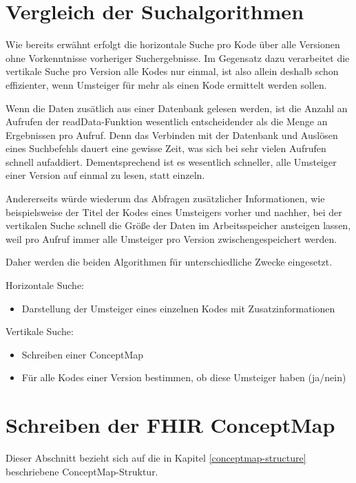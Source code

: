 
\section{Vergleich der Suchalgorithmen}

Wie bereits erwähnt erfolgt die horizontale Suche pro Kode über alle Versionen ohne Vorkenntnisse vorheriger Suchergebnisse. Im Gegensatz dazu verarbeitet die vertikale Suche pro Version alle Kodes nur einmal, ist also allein deshalb schon effizienter, wenn Umsteiger für mehr als einen Kode ermittelt werden sollen. 

Wenn die Daten zusätlich aus einer Datenbank gelesen werden, ist die Anzahl an Aufrufen der readData-Funktion wesentlich entscheidender als die Menge an Ergebnissen pro Aufruf. Denn das Verbinden mit der Datenbank und Auslösen eines Suchbefehls dauert eine gewisse Zeit, was sich bei sehr vielen Aufrufen schnell aufaddiert. Dementsprechend ist es wesentlich schneller, alle Umsteiger einer Version auf einmal zu lesen, statt einzeln. 

Andererseits würde wiederum das Abfragen zusätzlicher Informationen, wie beispielsweise der Titel der Kodes eines Umsteigers vorher und nachher, bei der vertikalen Suche schnell die Größe der Daten im Arbeitsspeicher ansteigen lassen, weil pro Aufruf immer alle Umsteiger pro Version zwischengespeichert werden. 

Daher werden die beiden Algorithmen für unterschiedliche Zwecke eingesetzt.

Horizontale Suche:

\begin{itemize}
\item Darstellung der Umsteiger eines einzelnen Kodes mit Zusatzinformationen
\end{itemize}

Vertikale Suche: 

\begin{itemize}
\item Schreiben einer ConceptMap
\item Für alle Kodes einer Version bestimmen, ob diese Umsteiger haben (ja/nein)
\end{itemize}

\section{Schreiben der FHIR ConceptMap}

Dieser Abschnitt bezieht sich auf die in Kapitel \ref{conceptmap-structure} beschriebene ConceptMap-Struktur. 

